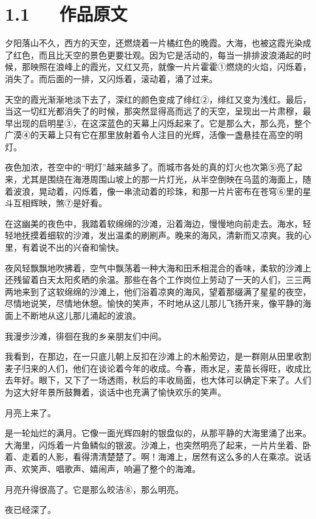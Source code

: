 \documentclass[letterpaper,10pt,english]{sphinxmanual}
\begin{document}
\section{1.1   作品原文}
\label{\detokenize{p01_u6563_u6587/_u5cfb_u9752-_u6d77_u6ee8_u4ef2_u590f_u591c:id3}}
夕阳落山不久，西方的天空，还燃烧着一片橘红色的晚霞。大海，也被这霞光染成了红色，而且比天空的景色更要壮观。因为它是活动的，每当一排排波浪涌起的时候，那映照在浪峰上的霞光，又红又亮，就像一片片霍霍①燃烧的火焰，闪烁着，消失了。而后面的一排，又闪烁着，滚动着，涌了过来。

天空的霞光渐渐地淡下去了，深红的颜色变成了绯红②，绯红又变为浅红。最后，当这一切红光都消失了的时候，那突然显得高而远了的天空，呈现出一片肃穆，最早出现的启明星③，在这深蓝色的天幕上闪烁起来了。它是那么大，那么亮，整个广漠④的天幕上只有它在那里放射着令人注目的光辉，活像一盏悬挂在高空的明灯。

夜色加浓，苍空中的“明灯”越来越多了。而城市各处的真的灯火也次第⑤亮了起来，尤其是围绕在海港周围山坡上的那一片灯光，从半空倒映在乌蓝的海面上，随着波浪，晃动着，闪烁着，像一串流动着的珍珠，和那一片片密布在苍穹⑥里的星斗互相辉映，煞⑦是好看。

在这幽美的夜色中，我踏着软绵绵的沙滩，沿着海边，慢慢地向前走去。海水，轻轻地抚摸着细软的沙滩，发出温柔的刷刷声。晚来的海风，清新而又凉爽。我的心里，有着说不出的兴奋和愉快。

夜风轻飘飘地吹拂着，空气中飘荡着一种大海和田禾相混合的香味，柔软的沙滩上还残留着白天太阳炙晒的余温。那些在各个工作岗位上劳动了一天的人们，三三两两地来到了这软绵绵的沙滩上，他们浴着凉爽的海风，望着那缀满了星星的夜空，尽情地说笑，尽情地休憩。愉快的笑声，不时地从这儿那儿飞扬开来，像平静的海面上不断地从这儿那儿涌起的波浪。

我漫步沙滩，徘徊在我的乡亲朋友们中间。

我看到，在那边，在一只底儿朝上反扣在沙滩上的木船旁边，是一群刚从田里收割麦子归来的人们，他们在谈论着今年的收成。今春，雨水足，麦苗长得旺，收成比去年好。眼下，又下了一场透雨，秋后的丰收局面，也大体可以确定下来了。人们为这大好年景所鼓舞着，谈话中也充满了愉快欢乐的笑声。

月亮上来了。

是一轮灿烂的满月。它像一面光辉四射的银盘似的，从那平静的大海里涌了出来。大海里，闪烁着一片鱼鳞似的银波。沙滩上，也突然明亮了起来，一片片坐着、卧着、走着的人影，看得清清楚楚了。啊！海滩上，居然有这么多的人在乘凉。说话声、欢笑声、唱歌声、嬉闹声，响遍了整个的海滩。

月亮升得很高了。它是那么皎洁⑧，那么明亮。

夜已经深了。
\end{document}
